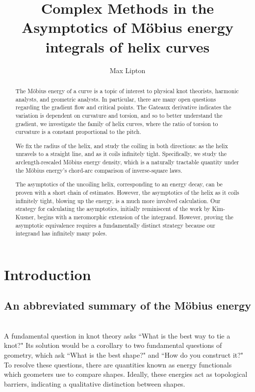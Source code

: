 \documentclass{amsart}
\title{Complex Methods in the Asymptotics of M\"obius energy integrals of helix curves}
\author{Max Lipton}
\theoremstyle{plain}
\numberwithin{theorem}{section}
\theoremstyle{definition}
\theoremstyle{remark}
\theoremstyle{brakets}
\begin{document}
\begin{abstract} The M\"obius energy of a curve is a topic of interest to physical knot theorists, harmonic analysts, and geometric analysts. In particular, there are many open questions regarding the gradient flow and critical points. The Gateaux derivative indicates the variation is dependent on curvature and torsion, and so to better understand the gradient, we investigate the family of helix curves, where the ratio of torsion to curvature is a constant proportional to the pitch.

We fix the radius of the helix, and study the coiling in both directions: as the helix unravels to a straight line, and as it coils infinitely tight. Specifically, we study the arclength-rescaled M\"obius energy density, which is a naturally tractable quantity under the M\"obius energy's chord-arc comparison of inverse-square laws. 

The asymptotics of the uncoiling helix, corresponding to an energy decay, can be proven with a short chain of estimates. However, the asymptotics of the helix as it coils infinitely tight, blowing up the energy, is a much more involved calculation. Our strategy for calculating the asymptotics, initially reminiscent of the work by Kim-Kusner, begins with a meromorphic extension of the integrand. However, proving the asymptotic equivalence requires a fundamentally distinct strategy because our integrand has infinitely many poles. 

\end{abstract}


\maketitle
\section{Introduction}
\subsection{An abbreviated summary of the M\"obius energy}
~\\
A fundamental question in knot theory asks ``What is the best way to tie a knot?" Its solution would be a corollary to two fundamental questions of geometry, which ask ``What is the best shape?" and ``How do you construct it?" To resolve these questions, there are quantities known as energy functionals which geometers use to compare shapes. Ideally, these energies act as topological barriers, indicating a qualitative distinction between shapes. 
\end{document}
